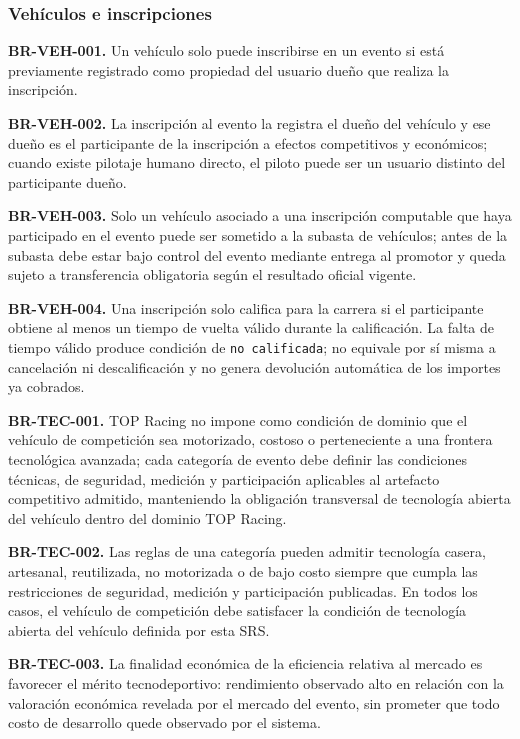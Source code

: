 \documentclass[10pt,letterpaper]{article}
\begin{document}
\subsubsection{Vehículos e inscripciones}
\noindent\textbf{BR-VEH-001.} Un vehículo solo puede inscribirse en un evento si está previamente registrado como propiedad del usuario dueño que realiza la inscripción.\par
\noindent\textbf{BR-VEH-002.} La inscripción al evento la registra el dueño del vehículo y ese dueño es el participante de la inscripción a efectos competitivos y económicos; cuando existe pilotaje humano directo, el piloto puede ser un usuario distinto del participante dueño.\par
\noindent\textbf{BR-VEH-003.} Solo un vehículo asociado a una inscripción computable que haya participado en el evento puede ser sometido a la subasta de vehículos; antes de la subasta debe estar bajo control del evento mediante entrega al promotor y queda sujeto a transferencia obligatoria según el resultado oficial vigente.\par
\noindent\textbf{BR-VEH-004.} Una inscripción solo califica para la carrera si el participante obtiene al menos un tiempo de vuelta válido durante la calificación. La falta de tiempo válido produce condición de \texttt{no calificada}; no equivale por sí misma a cancelación ni descalificación y no genera devolución automática de los importes ya cobrados.\par
\noindent\textbf{BR-TEC-001.} TOP Racing no impone como condición de dominio que el vehículo de competición sea motorizado, costoso o perteneciente a una frontera tecnológica avanzada; cada categoría de evento debe definir las condiciones técnicas, de seguridad, medición y participación aplicables al artefacto competitivo admitido, manteniendo la obligación transversal de tecnología abierta del vehículo dentro del dominio TOP Racing.\par
\noindent\textbf{BR-TEC-002.} Las reglas de una categoría pueden admitir tecnología casera, artesanal, reutilizada, no motorizada o de bajo costo siempre que cumpla las restricciones de seguridad, medición y participación publicadas. En todos los casos, el vehículo de competición debe satisfacer la condición de tecnología abierta del vehículo definida por esta SRS.\par
\noindent\textbf{BR-TEC-003.} La finalidad económica de la eficiencia relativa al mercado es favorecer el mérito tecnodeportivo: rendimiento observado alto en relación con la valoración económica revelada por el mercado del evento, sin prometer que todo costo de desarrollo quede observado por el sistema.\par
\end{document}

